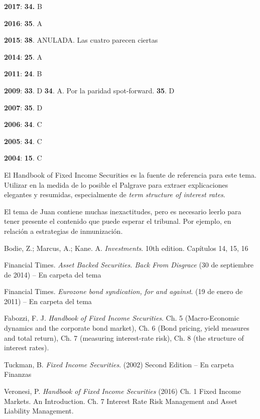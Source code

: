 \documentclass{nuevotema}
\begin{document}
\textbf{2017}: \textbf{34.} B

\textbf{2016}: \textbf{35}. A 

\textbf{2015}: \textbf{38}. ANULADA. Las cuatro parecen ciertas

\textbf{2014}: \textbf{25}. A

\textbf{2011}: \textbf{24}. B

\textbf{2009}: \textbf{33}. D \textbf{34}. A. Por la paridad spot-forward. \textbf{35}. D

\textbf{2007}: \textbf{35}. D

\textbf{2006}: \textbf{34}. C

\textbf{2005}: \textbf{34}. C

\textbf{2004}:  \textbf{15}. C

El Handbook of Fixed Income Securities es la fuente de referencia para este tema. Utilizar en la medida de lo posible el Palgrave para extraer explicaciones elegantes y resumidas, especialmente de \textit{term structure of interest rates}.

El tema de Juan contiene muchas inexactitudes, pero es necesario leerlo para tener presente el contenido que puede esperar el tribunal. Por ejemplo, en relación a estrategias de inmunización.

\bibliografia

Bodie, Z.; Marcus, A.; Kane. A. \textit{Investments}. 10th edition. Capítulos 14, 15, 16

Financial Times. \textit{Asset Backed Securities. Back From Disgrace} (30 de septiembre de 2014) -- En carpeta del tema

Financial Times. \textit{Eurozone bond syndication, for and against}. (19 de enero de 2011) -- En carpeta del tema

Fabozzi, F. J. \textit{Handbook of Fixed Income Securities}.  Ch. 5 (Macro-Economic dynamics and the corporate bond market), Ch. 6 (Bond pricing, yield measures and total return), Ch. 7 (measuring interest-rate risk), Ch. 8 (the structure of interest rates).

Tuckman, B. \textit{Fixed Income Securities}. (2002) Second Edition -- En carpeta Finanzas

Veronesi, P. \textit{Handbook of Fixed Income Securities} (2016) Ch. 1 Fixed Income Markets. An Introduction. Ch. 7 Interest Rate Risk Management and Asset Liability Management.
\end{document}
